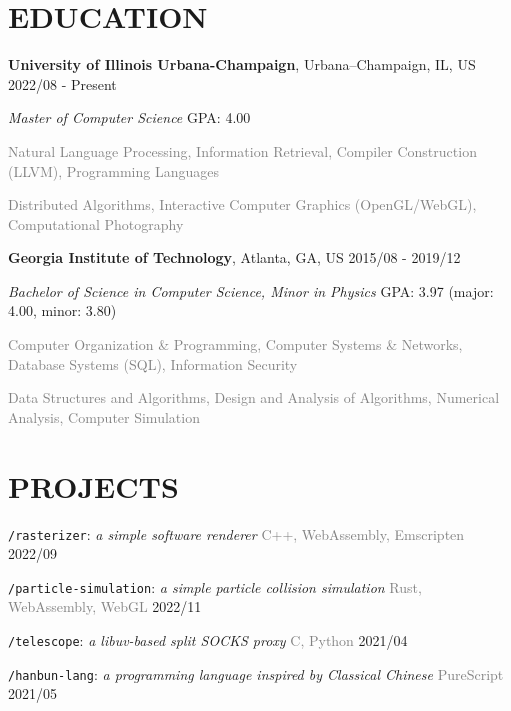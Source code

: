 \documentclass[10pt]{article}
\begin{document}
\section*{EDUCATION}
\textbf{University of Illinois Urbana-Champaign}, Urbana–Champaign, IL, US  \hfill 2022/08 - Present

\textit{Master of Computer Science}  \hfill GPA: 4.00

\vspace{0.5em}
\textcolor{gray}{Natural Language Processing, Information Retrieval, Compiler Construction (LLVM), Programming Languages}

\textcolor{gray}{Distributed Algorithms, Interactive Computer Graphics (OpenGL/WebGL), Computational Photography}

\vspace{1em}
\textbf{Georgia Institute of Technology}, Atlanta, GA, US \hfill 2015/08 - 2019/12

\textit{Bachelor of Science in Computer Science, Minor in Physics} \hfill GPA: 3.97 (major: 4.00, minor: 3.80)

\vspace{0.5em}
\textcolor{gray}{Computer Organization \& Programming, Computer Systems \& Networks, Database Systems (SQL), Information Security}

\textcolor{gray}{Data Structures and Algorithms, Design and Analysis of Algorithms, Numerical Analysis, Computer Simulation}


\section*{PROJECTS}

\vspace{0.5em}
\texttt{/rasterizer}: \textit{a simple software renderer} \hfill \textcolor{gray}{C++, WebAssembly, Emscripten} 2022/09

\vspace{0.5em}
\texttt{/particle-simulation}: \textit{a simple particle collision simulation} \hfill \textcolor{gray}{Rust, WebAssembly, WebGL}  2022/11

\vspace{0.5em}
\texttt{/telescope}: \textit{a libuv-based split SOCKS proxy} \hfill \textcolor{gray}{C, Python}  2021/04

\vspace{0.5em}
\texttt{/hanbun-lang}: \textit{a programming language inspired by Classical Chinese} \hfill \textcolor{gray}{PureScript}  2021/05
\end{document}
